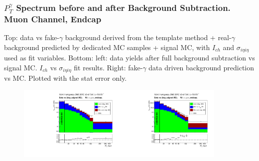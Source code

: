 \begin{frame}
\begin{figure}[htb]
\begin{center}
    \end{center}
  \end{figure}
\end{frame}%

\begin{frame}\frametitle{\footnotesize{$P_T^{\gamma}$ Spectrum before and after Background Subtraction. Muon Channel, Endcap}}
  \tiny{Top: data vs fake-$\gamma$ background derived from the template method + real-$\gamma$ background predicted by dedicated MC samples + signal MC, with $I_{ch}$ and $\sigma_{i\eta{i}\eta}$ used as fit variables. Bottom: left: data yields after full background subtraction vs signal MC. $I_{ch}$ vs $\sigma_{i\eta{i}\eta}$ fit results. Right: fake-$\gamma$ data driven background prediction vs MC. Plotted with the stat error only.}
  \begin{figure}[htb]
    \begin{center}
    \includegraphics[width=0.45\textwidth]{../figs/figs_v11/MUON_WGamma/PrepareYields/c_DATAvsBkgPlusSigMCc_MUON_WGamma_TEMPL_CHISO_UNblind__Endcap__phoEt.pdf}\includegraphics[width=0.45\textwidth]{../figs/figs_v11/MUON_WGamma/PrepareYields/c_DATAvsBkgPlusSigMCc_MUON_WGamma_TEMPL_SIHIH_UNblind__Endcap__phoEt.pdf}\\

\end{center}
\end{figure}
\end{frame}
